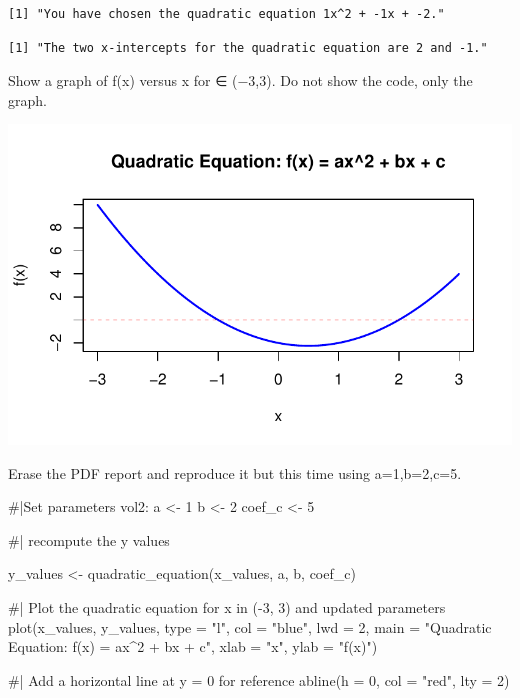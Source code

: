 \documentclass[
  letterpaper,
  DIV=11,
  numbers=noendperiod]{scrartcl}
\newenvironment{Shaded}{\begin{snugshade}}{\end{snugshade}}
\newcommand{\AttributeTok}[1]{\textcolor[rgb]{0.40,0.45,0.13}{#1}}
\newcommand{\CommentTok}[1]{\textcolor[rgb]{0.37,0.37,0.37}{#1}}
\newcommand{\DecValTok}[1]{\textcolor[rgb]{0.68,0.00,0.00}{#1}}
\newcommand{\FunctionTok}[1]{\textcolor[rgb]{0.28,0.35,0.67}{#1}}
\newcommand{\NormalTok}[1]{\textcolor[rgb]{0.00,0.23,0.31}{#1}}
\newcommand{\OtherTok}[1]{\textcolor[rgb]{0.00,0.23,0.31}{#1}}
\newcommand{\StringTok}[1]{\textcolor[rgb]{0.13,0.47,0.30}{#1}}
\begin{document}
\begin{verbatim}
[1] "You have chosen the quadratic equation 1x^2 + -1x + -2."
\end{verbatim}

\begin{verbatim}
[1] "The two x-intercepts for the quadratic equation are 2 and -1."
\end{verbatim}

Show a graph of f(x) versus x for ∈ (−3,3). Do not show the code, only
the graph.

\includegraphics{template_files/figure-pdf/unnamed-chunk-2-1.pdf}

Erase the PDF report and reproduce it but this time using a=1,b=2,c=5.

\begin{Shaded}
\begin{Highlighting}[]
\CommentTok{\#|Set parameters vol2:}
\NormalTok{a }\OtherTok{\textless{}{-}} \DecValTok{1}
\NormalTok{b }\OtherTok{\textless{}{-}} \DecValTok{2}
\NormalTok{coef\_c }\OtherTok{\textless{}{-}} \DecValTok{5}

\CommentTok{\#| recompute the y values }

\NormalTok{y\_values }\OtherTok{\textless{}{-}} \FunctionTok{quadratic\_equation}\NormalTok{(x\_values, a, b, coef\_c)}

\CommentTok{\#| Plot the quadratic equation for x in ({-}3, 3) and updated parameters}
\FunctionTok{plot}\NormalTok{(x\_values, y\_values, }\AttributeTok{type =} \StringTok{"l"}\NormalTok{, }\AttributeTok{col =} \StringTok{"blue"}\NormalTok{, }\AttributeTok{lwd =} \DecValTok{2}\NormalTok{,}
     \AttributeTok{main =} \StringTok{"Quadratic Equation: f(x) = ax\^{}2 + bx + c"}\NormalTok{,}
     \AttributeTok{xlab =} \StringTok{"x"}\NormalTok{, }\AttributeTok{ylab =} \StringTok{"f(x)"}\NormalTok{)}

\CommentTok{\#| Add a horizontal line at y = 0 for reference}
\FunctionTok{abline}\NormalTok{(}\AttributeTok{h =} \DecValTok{0}\NormalTok{, }\AttributeTok{col =} \StringTok{"red"}\NormalTok{, }\AttributeTok{lty =} \DecValTok{2}\NormalTok{)}
\end{Highlighting}
\end{Shaded}
\end{document}
